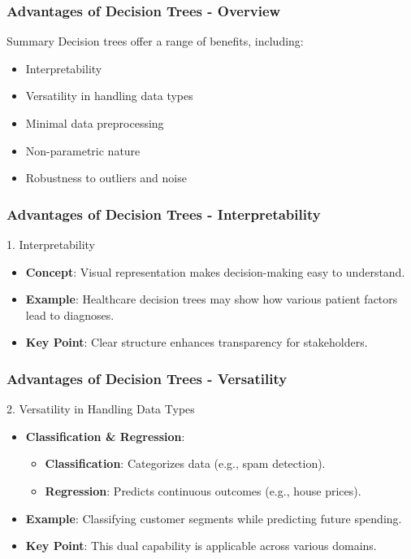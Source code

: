 \documentclass[aspectratio=169]{beamer}
\begin{document}
\begin{frame}[fragile]
    \frametitle{Advantages of Decision Trees - Overview}
    \begin{block}{Summary}
        Decision trees offer a range of benefits, including:
        \begin{itemize}
            \item Interpretability
            \item Versatility in handling data types
            \item Minimal data preprocessing
            \item Non-parametric nature
            \item Robustness to outliers and noise
        \end{itemize}
    \end{block}
\end{frame}

\begin{frame}[fragile]
    \frametitle{Advantages of Decision Trees - Interpretability}
    \begin{block}{1. Interpretability}
        \begin{itemize}
            \item \textbf{Concept}: Visual representation makes decision-making easy to understand.
            \item \textbf{Example}: Healthcare decision trees may show how various patient factors lead to diagnoses.
            \item \textbf{Key Point}: Clear structure enhances transparency for stakeholders.
        \end{itemize}
    \end{block}
\end{frame}

\begin{frame}[fragile]
    \frametitle{Advantages of Decision Trees - Versatility}
    \begin{block}{2. Versatility in Handling Data Types}
        \begin{itemize}
            \item \textbf{Classification \& Regression}:
                \begin{itemize}
                    \item \textbf{Classification}: Categorizes data (e.g., spam detection).
                    \item \textbf{Regression}: Predicts continuous outcomes (e.g., house prices).
                \end{itemize}
            \item \textbf{Example}: Classifying customer segments while predicting future spending.
            \item \textbf{Key Point}: This dual capability is applicable across various domains.
        \end{itemize}
    \end{block}
\end{frame}
\end{document}
